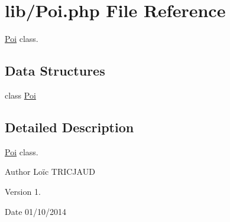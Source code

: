 \hypertarget{_poi_8php}{\section{lib/\-Poi.php File Reference}
\label{_poi_8php}
}


\hyperlink{class_poi}{Poi} class.  


\subsection*{Data Structures}
\begin{DoxyCompactItemize}
\item 
class \hyperlink{class_poi}{Poi}
\end{DoxyCompactItemize}


\subsection{Detailed Description}
\hyperlink{class_poi}{Poi} class. \begin{DoxyAuthor}{Author}
Loïc T\-R\-I\-C\-J\-A\-U\-D 
\end{DoxyAuthor}
\begin{DoxyVersion}{Version}
1. 
\end{DoxyVersion}
\begin{DoxyDate}{Date}
01/10/2014 
\end{DoxyDate}
